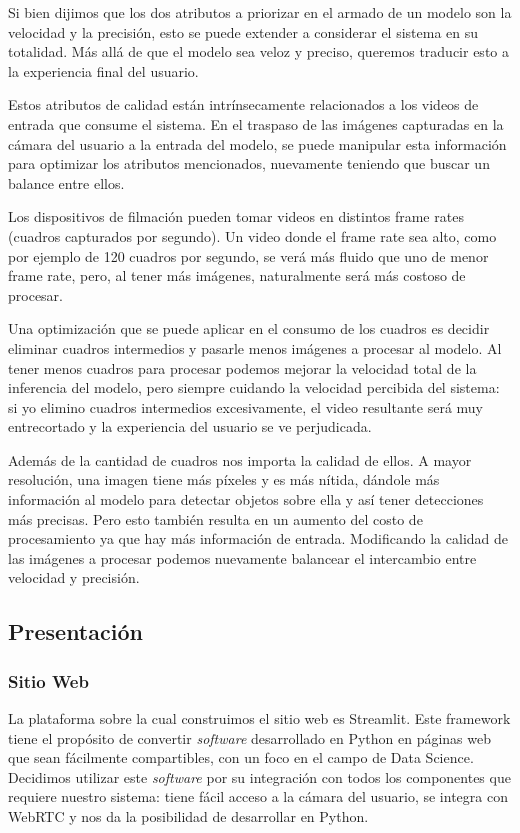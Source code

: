 \documentclass[a4paper]{article}
\begin{document}
Si bien dijimos que los dos atributos a priorizar en el armado de un modelo son la velocidad y la precisión, esto se puede extender a considerar el sistema en su totalidad. Más allá de que el modelo sea veloz y preciso, queremos traducir esto a la experiencia final del usuario.

Estos atributos de calidad están intrínsecamente relacionados a los videos de entrada que consume el sistema. En el traspaso de las imágenes capturadas en la cámara del usuario a la entrada del modelo, se puede manipular esta información para optimizar los atributos mencionados, nuevamente teniendo que buscar un balance entre ellos.

Los dispositivos de filmación pueden tomar videos en distintos frame rates (cuadros capturados por segundo). Un video donde el frame rate sea alto, como por ejemplo de 120 cuadros por segundo, se verá más fluido que uno de menor frame rate, pero, al tener más imágenes, naturalmente será más costoso de procesar.

Una optimización que se puede aplicar en el consumo de los cuadros es decidir eliminar cuadros intermedios y pasarle menos imágenes a procesar al modelo. Al tener menos cuadros para procesar podemos mejorar la velocidad total de la inferencia del modelo, pero siempre cuidando la velocidad percibida del sistema: si yo elimino cuadros intermedios excesivamente, el video resultante será muy entrecortado y la experiencia del usuario se ve perjudicada.

Además de la cantidad de cuadros nos importa la calidad de ellos. A mayor resolución, una imagen tiene más píxeles y es más nítida, dándole más información al modelo para detectar objetos sobre ella y así tener detecciones más precisas. Pero esto también resulta en un aumento del costo de procesamiento ya que hay más información de entrada. Modificando la calidad de las imágenes a procesar podemos nuevamente balancear el intercambio entre velocidad y precisión.

\subsection{Presentación}

\subsubsection{Sitio Web}

La plataforma sobre la cual construimos el sitio web es Streamlit. Este framework tiene el propósito de convertir \textit{software} desarrollado en Python en páginas web que sean fácilmente compartibles, con un foco en el campo de Data Science.
Decidimos utilizar este \textit{software} por su integración con todos los componentes que requiere nuestro sistema: tiene fácil acceso a la cámara del usuario, se integra con WebRTC y nos da la posibilidad de desarrollar en Python.
\end{document}
